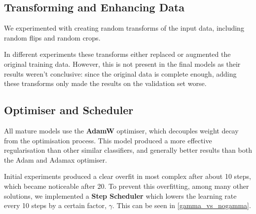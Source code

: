 \subsection{Transforming and Enhancing Data}



We experimented with creating random transforms of the input data, including random flips and random crops.

In different experiments these transforms either replaced or augmented the original training data.
However, this is not present in the final models as their results weren't conclusive: since the original data is complete enough, adding these transforms only made the results on the validation set worse.


\subsection{Optimiser and Scheduler}

All mature models use the \textbf{AdamW} optimiser, which decouples weight decay from the optimisation process\cite{adamW}.
This model produced a more effective \lt{} regularisation than other similar classifiers, and generally better results than both the Adam and Adamax optimiser.

Initial experiments produced a clear overfit in most complex after about 10 steps, which became noticeable after 20.
To prevent this overfitting, among many other solutions, we implemented a \textbf{Step Scheduler} which lowers the learning rate every 10 steps by a certain factor, $\gamma$.
This can be seen in \cref{gamma_vs_nogamma}.

